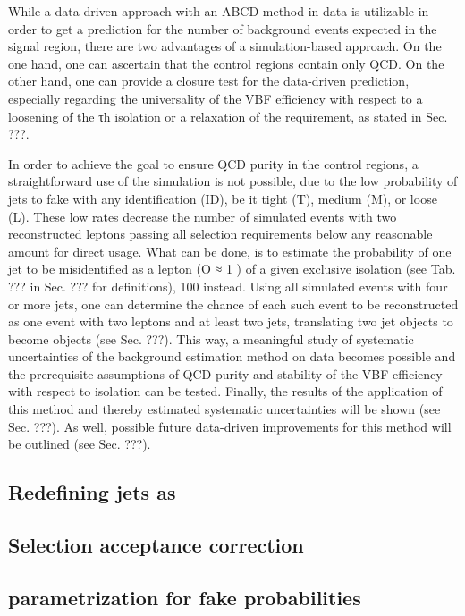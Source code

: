 While a data-driven approach with an ABCD method in data is utilizable in order to get a prediction for the number of background events expected in the signal region, there are two advantages of a simulation-based approach. On the one hand, one can ascertain that the control regions contain only QCD. On the other hand, one can provide a closure test for the data-driven prediction, especially regarding the universality of the VBF efficiency with respect to a loosening of the τh isolation or a relaxation of the \met requirement, as stated in Sec. ???.

In order to achieve the goal to ensure QCD purity in the control regions, a straightforward use of the simulation is not possible, due to the low probability of jets to fake \hadtau with any identification (ID), be it tight (T), medium (M), or loose (L). These low rates decrease the number of simulated events with two reconstructed \hadtau leptons passing all selection requirements below any reasonable amount for direct usage. What can be done, is to estimate the probability of one jet to be misidentified as a \hadtau lepton (O ≈ 1 ) of a given exclusive isolation (see Tab. ??? in Sec. ??? for definitions), 100 instead. Using all simulated events with four or more jets, one can determine the chance of each such event to be reconstructed as one event with two \hadtau leptons and at least two jets, translating two jet objects to become \hadtau objects (see Sec. ???). This way, a meaningful study of systematic uncertainties of the background estimation method on data becomes possible and the prerequisite assumptions of QCD purity and stability of the VBF efficiency with respect to \hadtaufake isolation can be tested. Finally, the results of the application of this method and thereby estimated systematic uncertainties will be shown (see Sec. ???). As well, possible future data-driven improvements for this method will be outlined (see Sec. ???).

\subsection*{Redefining jets as \hadtau}

\subsection*{Selection acceptance correction}

\subsection*{parametrization for fake probabilities}

